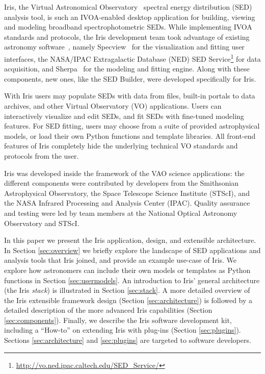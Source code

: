 \documentclass[preprint,authoryear,5p]{elsarticle}
\begin{document}
Iris, the Virtual Astronomical Observatory~\citep[VAO;][]{2012SPIE.8449E..0HB}
spectral energy distribution (SED) an\-alysis tool, is such an IVOA-enabled
desktop application for building, viewing and modeling broadband
spectrophotometric SEDs. While implementing IVOA standards and protocols, the
Iris development team took advantage of existing astronomy
software~\citep{2012ASPC..461..893D,2013AAS...22124038L}, namely
Specview~\citep{2002ASPC..281..120B} for the visualization and fitting user
interfaces, the NASA/IPAC Extragalactic Database (NED) SED Service\footnote{\url{http://vo.ned.ipac.caltech.edu/SED_Service/}} for data
acquisition, and Sherpa~\citep{2001SPIE.4477...76F} for the modeling and fitting
engine. Along with these components, new ones, like the SED Builder, were
developed specifically for Iris.

With Iris users may populate SEDs with data from files, built-in portals to data
archives, and other Virtual Observatory (VO) applications. Users can
interactively visualize and edit SEDs, and fit SEDs with fine-tuned modeling
features. For SED fitting, users may choose from a suite of provided astrophysical models, or
load their own Python functions and template libraries. All front-end features
of Iris completely hide the underlying technical VO standards and protocols from
the user.

Iris was developed inside the framework of the VAO science applications: the
different components were contributed by developers from the Smithsonian
Astrophysical Observatory, the Space Telescope Science Institute (STScI), and the NASA
Infrared Processing and Analysis Center (IPAC). Quality assurance and testing were led
by team members at the National Optical Astronomy Observatory and STScI.

In this paper we present the Iris application, design, and extensible architecture. In Section
\ref{sec:overview} we briefly explore the landscape of SED applications and
analysis tools that Iris joined, and provide an example use-case of Iris. We
explore how astronomers can include their own models or templates as Python
functions in Section \ref{sec:usermodels}. An introduction to Iris' general
architecture (the Iris \emph{stack}) is illustrated in Section \ref{sec:stack}.
A more detailed overview of the Iris extensible framework design (Section
\ref{sec:architecture}) is followed by a detailed description of the more
advanced Iris capabilities (Section \ref{sec:components}). Finally, we
describe the Iris software development kit, including a ``How-to'' on extending
Iris with plug-ins (Section \ref{sec:plugins}). Sections \ref{sec:architecture} and \ref{sec:plugins} are targeted to software
developers.
\end{document}
